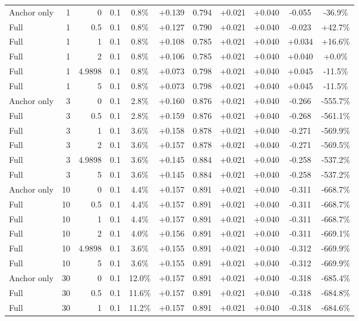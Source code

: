\begin{table}[htbp]
\begin{tabular}{lrrrccccccc}
Anchor only & 1 & 0 & 0.1 & 0.8\% & +0.139 & 0.794 & +0.021 & +0.040 & -0.055 & -36.9\% \\
Full & 1 & 0.5 & 0.1 & 0.8\% & +0.127 & 0.790 & +0.021 & +0.040 & -0.023 & +42.7\% \\
Full & 1 & 1 & 0.1 & 0.8\% & +0.108 & 0.785 & +0.021 & +0.040 & +0.034 & +16.6\% \\
Full & 1 & 2 & 0.1 & 0.8\% & +0.106 & 0.785 & +0.021 & +0.040 & +0.040 & +0.0\% \\
Full & 1 & 4.9898 & 0.1 & 0.8\% & +0.073 & 0.798 & +0.021 & +0.040 & +0.045 & -11.5\% \\
Full & 1 & 5 & 0.1 & 0.8\% & +0.073 & 0.798 & +0.021 & +0.040 & +0.045 & -11.5\% \\
Anchor only & 3 & 0 & 0.1 & 2.8\% & +0.160 & 0.876 & +0.021 & +0.040 & -0.266 & -555.7\% \\
Full & 3 & 0.5 & 0.1 & 2.8\% & +0.159 & 0.876 & +0.021 & +0.040 & -0.268 & -561.1\% \\
Full & 3 & 1 & 0.1 & 3.6\% & +0.158 & 0.878 & +0.021 & +0.040 & -0.271 & -569.9\% \\
Full & 3 & 2 & 0.1 & 3.6\% & +0.157 & 0.878 & +0.021 & +0.040 & -0.271 & -569.5\% \\
Full & 3 & 4.9898 & 0.1 & 3.6\% & +0.145 & 0.884 & +0.021 & +0.040 & -0.258 & -537.2\% \\
Full & 3 & 5 & 0.1 & 3.6\% & +0.145 & 0.884 & +0.021 & +0.040 & -0.258 & -537.2\% \\
Anchor only & 10 & 0 & 0.1 & 4.4\% & +0.157 & 0.891 & +0.021 & +0.040 & -0.311 & -668.7\% \\
Full & 10 & 0.5 & 0.1 & 4.4\% & +0.157 & 0.891 & +0.021 & +0.040 & -0.311 & -668.7\% \\
Full & 10 & 1 & 0.1 & 4.4\% & +0.157 & 0.891 & +0.021 & +0.040 & -0.311 & -668.7\% \\
Full & 10 & 2 & 0.1 & 4.0\% & +0.156 & 0.891 & +0.021 & +0.040 & -0.311 & -669.1\% \\
Full & 10 & 4.9898 & 0.1 & 3.6\% & +0.155 & 0.891 & +0.021 & +0.040 & -0.312 & -669.9\% \\
Full & 10 & 5 & 0.1 & 3.6\% & +0.155 & 0.891 & +0.021 & +0.040 & -0.312 & -669.9\% \\
Anchor only & 30 & 0 & 0.1 & 12.0\% & +0.157 & 0.891 & +0.021 & +0.040 & -0.318 & -685.4\% \\
Full & 30 & 0.5 & 0.1 & 11.6\% & +0.157 & 0.891 & +0.021 & +0.040 & -0.318 & -684.8\% \\
Full & 30 & 1 & 0.1 & 11.2\% & +0.157 & 0.891 & +0.021 & +0.040 & -0.318 & -684.6\% \\

\end{tabular}
\end{table}
